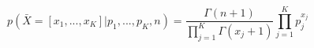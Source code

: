 $$
p(\bar{X}=[x_1, ..., x_K] | p_1, ..., p_K, n) = \frac{\Gamma(n+1)}{\prod_{j=1}^K\Gamma(x_j + 1)} \prod_{j=1}^K p_j^{x_j}
$$